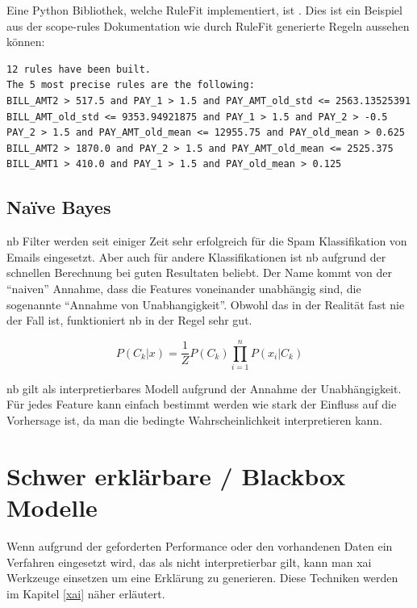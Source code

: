 \documentclass[
  12pt, %
  a4paper, %
  oneside, %
  openany, 
  numbers=noenddot, %
  BCOR=5mm, %
  parskip=half*, %
  thesis, %
]{bfhbook}
\begin{document}
Eine Python Bibliothek, welche RuleFit implementiert, ist \parencite{scopeRules}. Dies ist ein Beispiel aus der scope-rules Dokumentation wie durch RuleFit generierte Regeln aussehen können:
\begin{minipage}[t]{\linewidth}
\begin{lstlisting}
12 rules have been built.
The 5 most precise rules are the following:
BILL_AMT2 > 517.5 and PAY_1 > 1.5 and PAY_AMT_old_std <= 2563.13525391
BILL_AMT_old_std <= 9353.94921875 and PAY_1 > 1.5 and PAY_2 > -0.5
PAY_2 > 1.5 and PAY_AMT_old_mean <= 12955.75 and PAY_old_mean > 0.625
BILL_AMT2 > 1870.0 and PAY_2 > 1.5 and PAY_AMT_old_mean <= 2525.375
BILL_AMT1 > 410.0 and PAY_1 > 1.5 and PAY_old_mean > 0.125
\end{lstlisting}
\end{minipage}

\subsection{Naïve Bayes}
\label{nb}
\Gls{nb} Filter werden seit einiger Zeit sehr erfolgreich für die Spam Klassifikation von Emails eingesetzt. Aber auch für andere Klassifikationen ist \Gls{nb} aufgrund der schnellen Berechnung bei guten Resultaten beliebt. Der Name kommt von der ``naiven'' Annahme, dass die Features voneinander unabhängig sind, die sogenannte  ``Annahme von Unabhangigkeit''. Obwohl das in der Realität fast nie der Fall ist, funktioniert \Gls{nb} in der Regel sehr gut.

\[ P(C_k|x) = \frac{1}{Z}P(C_k) \prod_{i=1}^{n}  P(x_i|C_k) \]

\Gls{nb} gilt als interpretierbares Modell aufgrund der Annahme der Unabhängigkeit. Für jedes Feature kann einfach bestimmt werden wie stark der Einfluss auf die Vorhersage ist, da man die bedingte Wahrscheinlichkeit interpretieren kann.

\section{Schwer erklärbare / Blackbox Modelle}
Wenn aufgrund der geforderten Performance oder den vorhandenen Daten ein Verfahren eingesetzt wird, das als nicht interpretierbar gilt, kann man \Gls{xai} Werkzeuge einsetzen um eine Erklärung zu generieren. Diese Techniken werden im Kapitel \ref{xai} näher erläutert.
\end{document}
